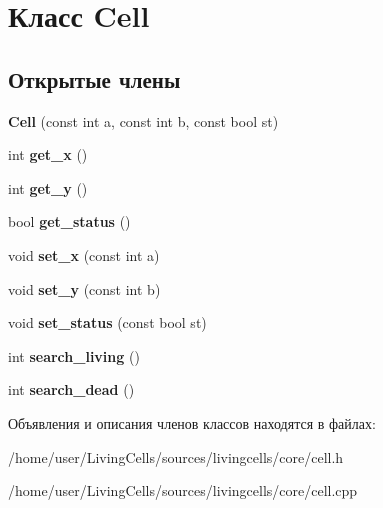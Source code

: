 \hypertarget{classCell}{\section{Класс Cell}
\label{classCell}
}
\subsection*{Открытые члены}
\begin{DoxyCompactItemize}
\item 
\hypertarget{classCell_ac0f95844f9717e8eb46bda2940e37556}{{\bfseries Cell} (const int a, const int b, const bool st)}\label{classCell_ac0f95844f9717e8eb46bda2940e37556}

\item 
\hypertarget{classCell_a00989b383714d8f6d051677b96a3adcb}{int {\bfseries get\+\_\+x} ()}\label{classCell_a00989b383714d8f6d051677b96a3adcb}

\item 
\hypertarget{classCell_a957598cfc79e75ae651126173425d3fc}{int {\bfseries get\+\_\+y} ()}\label{classCell_a957598cfc79e75ae651126173425d3fc}

\item 
\hypertarget{classCell_a5e113f816cd4750eccd1846af81845ac}{bool {\bfseries get\+\_\+status} ()}\label{classCell_a5e113f816cd4750eccd1846af81845ac}

\item 
\hypertarget{classCell_a6f1ad5d04d79f0d7e0b3c8587dcb6c4b}{void {\bfseries set\+\_\+x} (const int a)}\label{classCell_a6f1ad5d04d79f0d7e0b3c8587dcb6c4b}

\item 
\hypertarget{classCell_a24fb665d79a98537dbae0764aae6cdc2}{void {\bfseries set\+\_\+y} (const int b)}\label{classCell_a24fb665d79a98537dbae0764aae6cdc2}

\item 
\hypertarget{classCell_aae843541fe3b463ed77d5530e9cab752}{void {\bfseries set\+\_\+status} (const bool st)}\label{classCell_aae843541fe3b463ed77d5530e9cab752}

\item 
\hypertarget{classCell_ac45949aec18ee3e3a281104e8219242b}{int {\bfseries search\+\_\+living} ()}\label{classCell_ac45949aec18ee3e3a281104e8219242b}

\item 
\hypertarget{classCell_a6b7ced893f37cc3ea997d175b83d0a08}{int {\bfseries search\+\_\+dead} ()}\label{classCell_a6b7ced893f37cc3ea997d175b83d0a08}

\end{DoxyCompactItemize}


Объявления и описания членов классов находятся в файлах\+:\begin{DoxyCompactItemize}
\item 
/home/user/\+Living\+Cells/sources/livingcells/core/cell.\+h\item 
/home/user/\+Living\+Cells/sources/livingcells/core/cell.\+cpp\end{DoxyCompactItemize}
